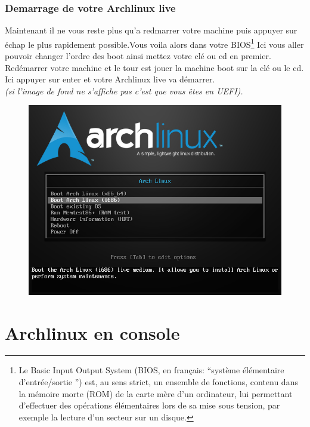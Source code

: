 \documentclass[a4paper]{book}
\begin{document}
\section{Demarrage de votre Archlinux live}
Maintenant il ne vous reste plus qu'a redmarrer votre machine puis appuyer
sur \'echap le plus rapidement possible.Vous voila alors dans votre
BIOS\footnote{Le Basic Input Output System (BIOS, en français:
  ``système élémentaire d'entrée/sortie '') est, au sens strict, un ensemble de
  fonctions, contenu dans la mémoire morte (ROM) de la carte mère d'un
  ordinateur, lui permettant d'effectuer des opérations élémentaires lors de sa
mise sous tension, par exemple la lecture d'un secteur sur un disque.}
Ici vous aller pouvoir changer l'ordre des boot ainsi mettez votre cl\'e ou
cd en premier.\\
Red\'emarrer votre machine et le tour est jouer la machine boot sur la cl\'e ou
le cd.
Ici appuyer sur enter et votre Archlinux live va d\'emarrer.\\
{\itshape(si l'image de fond ne s'affiche pas c'est que vous êtes en UEFI).}
\begin{figure}[h]
  \includegraphics[width=\textwidth]{images/usb_boot}
\end{figure}
\part{Archlinux en console}
\end{document}
